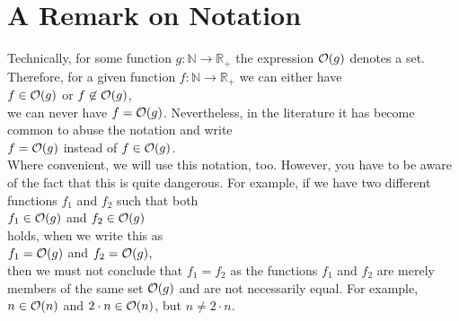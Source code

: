 \section{A Remark on Notation}
Technically, for some function $g:\mathbb{N} \rightarrow \mathbb{R}_+$ the expression $\mathcal{O}(g)$
denotes a set.  Therefore, for a given function $f:\mathbb{N} \rightarrow \mathbb{R}_+$ we can
either have
\\[0.2cm]
\hspace*{1.3cm}
$f \in \mathcal{O}(g)$ \quad or \quad $f \not\in \mathcal{O}(g)$,
\\[0.2cm]
we can never have $f = \mathcal{O}(g)$.  Nevertheless, in the literature it has become common to abuse the
notation and write
\\[0.2cm]
\hspace*{1.3cm}
$f = \mathcal{O}(g)$ \quad instead of \quad $f \in \mathcal{O}(g)$.
\\[0.2cm]
Where convenient, we will use this notation, too.  However, you have to be aware of the fact that
this is quite dangerous.  For example, if we have two different functions $f_1$ and
$f_2$ such that both
\\[0.2cm]
\hspace*{1.3cm}
$f_1 \in \mathcal{O}(g)$ \quad and \quad $f_2 \in \mathcal{O}(g)$
\\[0.2cm]
holds, when we write this as
\\[0.2cm]
\hspace*{1.3cm}
$f_1 = \mathcal{O}(g)$ \quad and \quad $f_2 = \mathcal{O}(g)$,
\\[0.2cm]
then we must not conclude that $f_1 = f_2$ as the functions $f_1$ and $f_2$ are merely members of
the same set $\mathcal{O}(g)$ and are not necessarily equal.  For example, $n \in \mathcal{O}(n)$ and 
$2 \cdot n \in \mathcal{O}(n)$,  but $n \not= 2 \cdot n$.
\vspace*{0.3cm}

